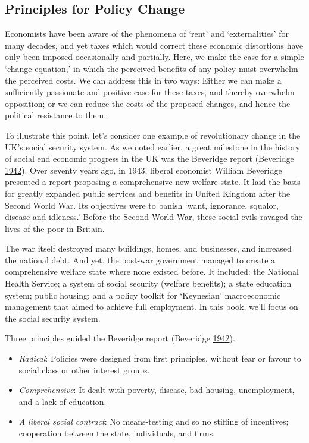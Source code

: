 \documentclass[]{tufte-handout}
\providecommand{\tightlist}{%
  \setlength{\itemsep}{0pt}\setlength{\parskip}{0pt}}
\begin{document}
\hypertarget{principles-for-policy-change}{%
\subsection{Principles for Policy
Change}\label{principles-for-policy-change}}

Economists have been aware of the phenomena of `rent' and
`externalities' for many decades, and yet taxes which would correct
these economic distortions have only been imposed occasionally and
partially. Here, we make the case for a simple `change equation,' in
which the perceived benefits of any policy must overwhelm the perceived
costs. We can address this in two ways: Either we can make a
sufficiently passionate and positive case for these taxes, and thereby
overwhelm opposition; or we can reduce the costs of the proposed
changes, and hence the political resistance to them.

To illustrate this point, let's consider one example of revolutionary
change in the UK's social security system. As we noted earlier, a great
milestone in the history of social end economic progress in the UK was
the Beveridge report (Beveridge
\protect\hyperlink{ref-Beveridge1942}{1942}). Over seventy years ago, in
1943, liberal economist William Beveridge presented a report proposing a
comprehensive new welfare state. It laid the basis for greatly expanded
public services and benefits in United Kingdom after the Second World
War. Its objectives were to banish `want, ignorance, squalor, disease
and idleness.' Before the Second World War, these social evils ravaged
the lives of the poor in Britain.

The war itself destroyed many buildings, homes, and businesses, and
increased the national debt. And yet, the post-war government managed to
create a comprehensive welfare state where none existed before. It
included: the National Health Service; a system of social security
(welfare benefits); a state education system; public housing; and a
policy toolkit for `Keynesian' macroeconomic management that aimed to
achieve full employment. In this book, we'll focus on the social
security system.

Three principles guided the Beveridge report (Beveridge
\protect\hyperlink{ref-Beveridge1942}{1942}).

\begin{itemize}
\tightlist
\item
  \emph{Radical}: Policies were designed from first principles, without
  fear or favour to social class or other interest groups.
\item
  \emph{Comprehensive}: It dealt with poverty, disease, bad housing,
  unemployment, and a lack of education.
\item
  \emph{A liberal social contract}: No means-testing and so no stifling
  of incentives; cooperation between the state, individuals, and firms.
\end{itemize}
\end{document}
